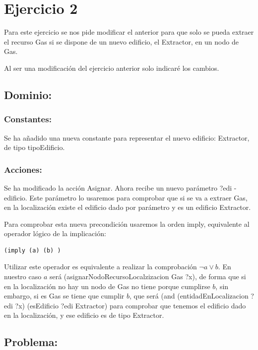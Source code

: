 \documentclass[11pt, spanish]{article}
\begin{document}
\section{Ejercicio 2}

Para este ejercicio se nos pide modificar el anterior para que solo se pueda extraer el recurso Gas si se dispone de un nuevo edificio, el Extractor, en un nodo de Gas.

Al ser una modificación del ejercicio anterior solo indicaré los cambios.

\subsection{Dominio:}

\subsubsection{Constantes:}

Se ha añadido una nueva constante para representar el nuevo edificio: Extractor, de tipo tipoEdificio.

\subsubsection{Acciones:}

Se ha modificado la acción Asignar. Ahora recibe un nuevo parámetro ?edi - edificio. Este parámetro lo usaremos para comprobar que si se va a extraer Gas, en la localización existe el edificio dado por parámetro y es un edificio Extractor.

Para comprobar esta nueva precondición usaremos la orden imply, equivalente al operador lógico de la implicación:

\begin{lstlisting}
(imply (a) (b) )
\end{lstlisting}

Utilizar este operador es equivalente a realizar la comprobación $\neg a \lor b$. En nuestro caso $a$ será  (asignarNodoRecursoLocalzizacion Gas ?x), de forma que si en la localización no hay un nodo de Gas no tiene porque cumplirse $b$, sin embargo, si es Gas se tiene que cumplir $b$, que será (and (entidadEnLocalizacion ?edi ?x) (esEdificio ?edi Extractor) para comprobar que tenemos el edificio dado en la localización, y ese edificio es de tipo Extractor.

\subsection{Problema:}
\end{document}

